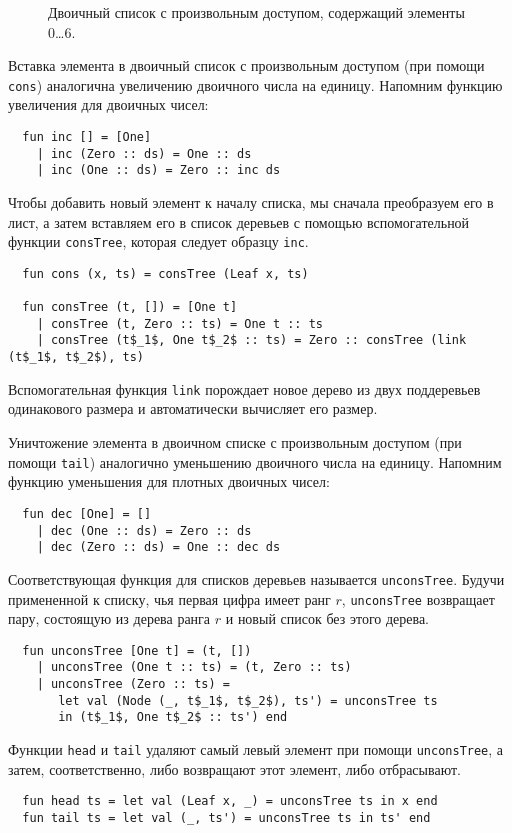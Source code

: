 \begin{figure}
  \centering
  
  \caption{Двоичный список с произвольным доступом, содержащий элементы 0\ldots 6.}
  \label{fig:9.5}
\end{figure}

Вставка элемента в двоичный список с произвольным доступом (при помощи
\lstinline!cons!) аналогична увеличению двоичного числа на
единицу. Напомним функцию увеличения для двоичных чисел:
\begin{lstlisting}
  fun inc [] = [One]
    | inc (Zero :: ds) = One :: ds
    | inc (One :: ds) = Zero :: inc ds
\end{lstlisting}
Чтобы добавить новый элемент к началу списка, мы сначала преобразуем
его в лист, а затем вставляем его в список деревьев с помощью
вспомогательной функции \lstinline!consTree!, которая следует образцу
\lstinline!inc!.
\begin{lstlisting}
  fun cons (x, ts) = consTree (Leaf x, ts)

  fun consTree (t, []) = [One t]
    | consTree (t, Zero :: ts) = One t :: ts
    | consTree (t$_1$, One t$_2$ :: ts) = Zero :: consTree (link (t$_1$, t$_2$), ts)
\end{lstlisting}
Вспомогательная функция \lstinline!link! порождает новое дерево из двух
поддеревьев одинакового размера и автоматически вычисляет его размер.

Уничтожение элемента в двоичном списке с произвольным доступом (при
помощи \lstinline!tail!) аналогично уменьшению двоичного числа на
единицу. Напомним функцию уменьшения для плотных двоичных чисел:
\begin{lstlisting}
  fun dec [One] = []
    | dec (One :: ds) = Zero :: ds
    | dec (Zero :: ds) = One :: dec ds
\end{lstlisting}
Соответствующая функция для списков деревьев называется
\lstinline!unconsTree!. Будучи примененной к списку, чья первая цифра
имеет ранг $r$, \lstinline!unconsTree! возвращает пару, состоящую из
дерева ранга $r$ и новый список без этого дерева.
\begin{lstlisting}
  fun unconsTree [One t] = (t, [])
    | unconsTree (One t :: ts) = (t, Zero :: ts)
    | unconsTree (Zero :: ts) = 
       let val (Node (_, t$_1$, t$_2$), ts') = unconsTree ts
       in (t$_1$, One t$_2$ :: ts') end
\end{lstlisting}
Функции \lstinline!head! и \lstinline!tail!  удаляют самый левый
элемент при помощи \lstinline!unconsTree!, а затем, соответственно,
либо возвращают этот элемент, либо отбрасывают.
\begin{lstlisting}
  fun head ts = let val (Leaf x, _) = unconsTree ts in x end
  fun tail ts = let val (_, ts') = unconsTree ts in ts' end
\end{lstlisting}

